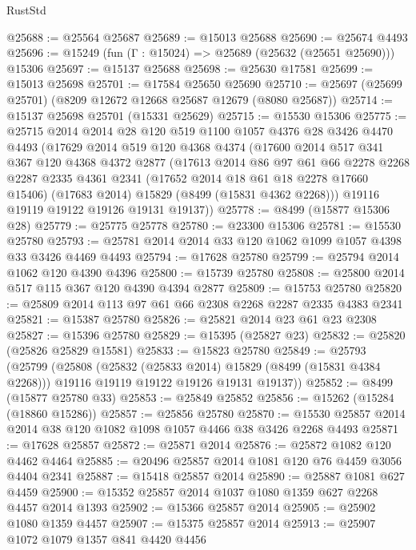 \begin{lexlean}{RustStd}
\begin{coremodule}
@25688 := @25564 @25687
@25689 := @15013 @25688
@25690 := @25674 @4493
@25696 := @15249 (fun (Γ : @15024) => @25689 (@25632 (@25651 @25690))) @15306
@25697 := @15137 @25688
@25698 := @25630 @17581
@25699 := @15013 @25698
@25701 := @17584 @25650 @25690
@25710 := @25697 (@25699 @25701) (@8209 @12672 @12668 @25687 @12679 (@8080 @25687))
@25714 := @15137 @25698 @25701 (@15331 @25629)
@25715 := @15530 @15306
@25775 := @25715
    @2014
    @2014
    @28
    @120
    @519
    @1100
    @1057
    @4376
    @28
    @3426
    @4470
    @4493
    (@17629
      @2014
      @519
      @120
      @4368
      @4374
      (@17600
        @2014
        @517
        @341
        @367
        @120
        @4368
        @4372
        @2877
        (@17613
          @2014
          @86
          @97
          @61
          @66
          @2278
          @2268
          @2287
          @2335
          @4361
          @2341
          (@17652 @2014 @18 @61 @18 @2278 @17660 @15406)
          (@17683 @2014)
          @15829
          (@8499 (@15831 @4362 @2268)))
        @19116
        @19119
        @19122
        @19126
        @19131
        @19137))
@25778 := @8499 (@15877 @15306 @28)
@25779 := @25775 @25778
@25780 := @23300 @15306
@25781 := @15530 @25780
@25793 := @25781 @2014 @2014 @33 @120 @1062 @1099 @1057 @4398 @33 @3426 @4469 @4493
@25794 := @17628 @25780
@25799 := @25794 @2014 @1062 @120 @4390 @4396
@25800 := @15739 @25780
@25808 := @25800 @2014 @517 @115 @367 @120 @4390 @4394 @2877
@25809 := @15753 @25780
@25820 := @25809 @2014 @113 @97 @61 @66 @2308 @2268 @2287 @2335 @4383 @2341
@25821 := @15387 @25780
@25826 := @25821 @2014 @23 @61 @23 @2308
@25827 := @15396 @25780
@25829 := @15395 (@25827 @23)
@25832 := @25820 (@25826 @25829 @15581)
@25833 := @15823 @25780
@25849 := @25793
    (@25799
      (@25808
        (@25832 (@25833 @2014) @15829 (@8499 (@15831 @4384 @2268)))
        @19116
        @19119
        @19122
        @19126
        @19131
        @19137))
@25852 := @8499 (@15877 @25780 @33)
@25853 := @25849 @25852
@25856 := @15262 (@15284 (@18860 @15286))
@25857 := @25856 @25780
@25870 := @15530 @25857 @2014 @2014 @38 @120 @1082 @1098 @1057 @4466 @38 @3426 @2268 @4493
@25871 := @17628 @25857
@25872 := @25871 @2014
@25876 := @25872 @1082 @120 @4462 @4464
@25885 := @20496 @25857 @2014 @1081 @120 @76 @4459 @3056 @4404 @2341
@25887 := @15418 @25857 @2014
@25890 := @25887 @1081 @627 @4459
@25900 := @15352 @25857 @2014 @1037 @1080 @1359 @627 @2268 @4457 @2014 @1393
@25902 := @15366 @25857 @2014
@25905 := @25902 @1080 @1359 @4457
@25907 := @15375 @25857 @2014
@25913 := @25907 @1072 @1079 @1357 @841 @4420 @4456

\end{coremodule}
\end{lexlean}
